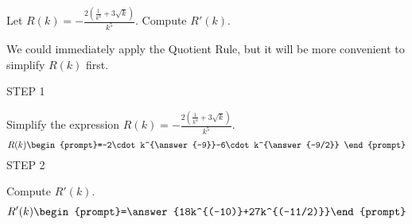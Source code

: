\documentclass{ximera}
\author{Bart Snapp\and Nela Lakos}
\begin{document}
\begin{exercise}
Let $R(k) = -\frac{2 \left(\frac{1}{k^4}+3 \sqrt{k}\right)}{k^5}$. Compute $R'(k)$.

\begin{hint}
We could immediately apply the Quotient Rule, but it will be more convenient to simplify $R(k)$ first. 
\end{hint}

STEP 1


Simplify the expression $R(k)=-\frac{2 \left(\frac{1}{k^4}+3 \sqrt{k}\right)}{k^5}$.
\[
R(k)
\begin{prompt}=-2\cdot k^{\answer{-9}}-6\cdot k^{\answer{-9/2}} \end{prompt}
\]
STEP 2

Compute $R'(k)$.
\[
R'(k)
\begin{prompt}=\answer{18k^{(-10)}+27k^{(-11/2)}}\end{prompt}
\]
\end{exercise}
\end{document}
